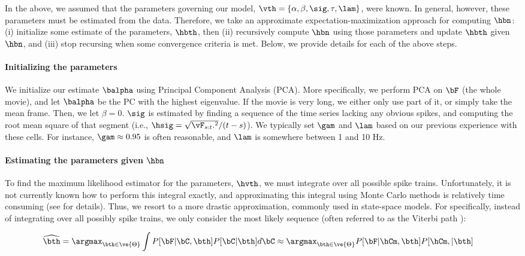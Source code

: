 In the above, we assumed that the parameters governing our model, $\vth=\{\alpha, \beta, \sig, \tau, \lam\}$, were known. In general, however, these parameters must be estimated from the data. Therefore, we take an approximate expectation-maximization approach for computing $\hbn$: (i) initialize some estimate of the parameters, $\hbth$, then (ii) recursively compute $\hbn$ using those parameters and update $\hbth$ given $\hbn$, and (iii) stop recursing when some convergence criteria is met.  Below, we provide details for each of the above steps.

\paragraph{Initializing the parameters}

We initialize our estimate $\balpha$ using Principal Component Analysis (PCA). More specifically, we perform PCA on $\bF$ (the whole movie), and let $\balpha$ be the PC with the highest eigenvalue.  If the movie is very long, we either only use part of it, or simply take the mean frame.  Then, we let $\beta=0$.  $\sig$ is estimated by finding a sequence of the time series lacking any obvious spikes, and computing the root mean square of that segment (i.e., $\hsig=\sqrt{\vF_{s:t}.^2}/(t-s)$).  We typically set $\gam$ and $\lam$ based on our previous experience with these cells.  For instance, $\gam \approx 0.95$ is often reasonable, and $\lam$ is somewhere between 1 and 10 Hz.  

\paragraph{Estimating the parameters given $\hbn$}

To find the maximum likelihood estimator for the parameters, $\hvth$, we must integrate over all possible spike trains. Unfortunately, it is not currently known how to perform this integral exactly, and approximating this integral using Monte Carlo methods is relatively time consuming (see \cite{VogelsteinPaninski09} for details).  Thus, we resort to a more drastic approximation, commonly used in state-space models.  For specifically, instead of integrating over all possibly spike trains, we only consider the most likely sequence (often referred to as the Viterbi path \cite{Rabiner89}): 

\begin{align} \label{eq:par1}
\widehat{\bth} &= \argmax_{\bth \in \ve{\Theta}} \int P[\bF|\bC, \bth] P[\bC | \bth]  d\bC  \approx \argmax_{\bth \in \ve{\Theta}}P[\bF| \hCm, \bth] P[\hCm, | \bth]
\end{align}

